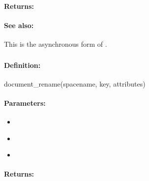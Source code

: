 \paragraph{Returns:}


\paragraph{See also:}  This is the asynchronous form of .

\pagebreak
\subsubsection{}
\label{api:ruby:document_rename}


\paragraph{Definition:}
\begin{rubycode}
document_rename(spacename, key, attributes)
\end{rubycode}

\paragraph{Parameters:}
\begin{itemize}[noitemsep]
\item {}\\

\item {}\\

\item {}\\

\end{itemize}

\paragraph{Returns:}


\pagebreak
\subsubsection{}
\label{api:ruby:async_document_rename}


